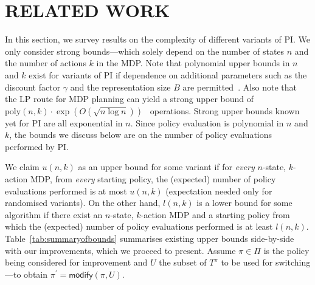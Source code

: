 \section{RELATED WORK}
\label{sec:relatedworkandcontribution}


In this section, we survey results on the complexity of different variants of PI. We only consider strong bounds---which solely depend on the number of states $n$ and the number of actions $k$ in the MDP. Note that polynomial upper bounds in $n$ and $k$ exist for variants of PI if dependence on additional parameters such as the discount factor $\gamma$ and the representation size $B$ are permitted~\cite{Ye:2011,Scherrer:2013}. Also note that the LP route for MDP planning can yield a strong upper bound of $\text{poly}(n, k) \cdot \exp(O(\sqrt{n
  \log n}))$~\cite{Matousek+SW:1996} operations. Strong upper bounds known yet for PI  are all exponential in $n$. Since policy evaluation is polynomial in $n$ and $k$, the bounds we discuss below are on the number of policy evaluations performed by PI.
  
We claim $u(n, k)$ as an upper bound for some variant if for \textit{every} $n$-state, $k$-action MDP, from \textit{every} starting policy, the (expected) number of policy evaluations performed is at most $u(n, k)$ (expectation needed only for randomised variants). On the other hand, $l(n, k)$ is a lower bound for some algorithm if there exist an $n$-state, $k$-action MDP and a starting policy from which the (expected) number of policy evaluations performed is at least $l(n, k)$. Table~\ref{tab:summaryofbounds} summarises existing upper bounds side-by-side with our improvements, which we proceed to present. Assume $\pi \in \Pi$ is the policy being considered for improvement and $U$ the subset of $T^{\pi}$ to be used for switching---to obtain $\pi^{\prime} = \textsf{modify}(\pi, U)$.

